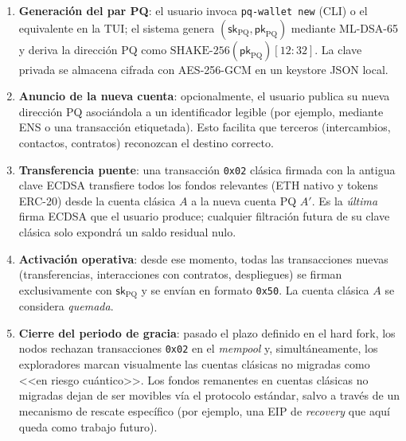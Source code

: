 \begin{enumerate}
  \item \textbf{Generación del par PQ}: el usuario invoca \texttt{pq-wallet new} (CLI) o el equivalente en la TUI; el sistema genera $(\textsf{sk}_\text{PQ}, \textsf{pk}_\text{PQ})$ mediante ML-DSA-65 y deriva la dirección PQ como $\text{SHAKE-256}(\textsf{pk}_\text{PQ})[12{:}32]$. La clave privada se almacena cifrada con AES-256-GCM en un keystore JSON local.
  
  \item \textbf{Anuncio de la nueva cuenta}: opcionalmente, el usuario publica su nueva dirección PQ asociándola a un identificador legible (por ejemplo, mediante ENS o una transacción etiquetada). Esto facilita que terceros (intercambios, contactos, contratos) reconozcan el destino correcto.
  
  \item \textbf{Transferencia puente}: una transacción \texttt{0x02} clásica firmada con la antigua clave ECDSA transfiere todos los fondos relevantes (ETH nativo y tokens ERC-20) desde la cuenta clásica $A$ a la nueva cuenta PQ $A'$. Es la \emph{última} firma ECDSA que el usuario produce; cualquier filtración futura de su clave clásica solo expondrá un saldo residual nulo.
  
  \item \textbf{Activación operativa}: desde ese momento, todas las transacciones nuevas (transferencias, interacciones con contratos, despliegues) se firman exclusivamente con $\textsf{sk}_\text{PQ}$ y se envían en formato \texttt{0x50}. La cuenta clásica $A$ se considera \emph{quemada}.
  
  \item \textbf{Cierre del periodo de gracia}: pasado el plazo definido en el hard fork, los nodos rechazan transacciones \texttt{0x02} en el \emph{mempool} y, simultáneamente, los exploradores marcan visualmente las cuentas clásicas no migradas como <<en riesgo cuántico>>. Los fondos remanentes en cuentas clásicas no migradas dejan de ser movibles vía el protocolo estándar, salvo a través de un mecanismo de rescate específico (por ejemplo, una EIP de \emph{recovery} que aquí queda como trabajo futuro).
\end{enumerate}

